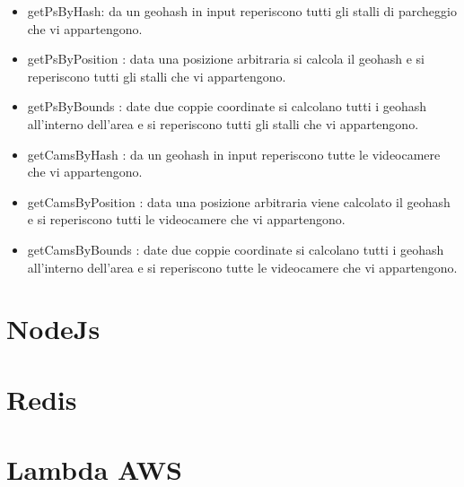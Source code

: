 \begin{itemize}
	\item getPsByHash: da un geohash in input reperiscono tutti gli stalli di parcheggio che vi appartengono.
	\item getPsByPosition : data una posizione arbitraria si calcola il geohash e si reperiscono tutti gli stalli che vi appartengono.
	\item getPsByBounds : date due coppie coordinate si calcolano tutti i geohash all'interno dell'area e si reperiscono tutti gli stalli che vi appartengono.
	\item getCamsByHash : da un geohash in input reperiscono tutte le videocamere che vi appartengono.
	\item getCamsByPosition : data una posizione arbitraria viene calcolato il geohash e si reperiscono tutti le videocamere che vi appartengono.
	\item getCamsByBounds : date due coppie coordinate si calcolano tutti i geohash all'interno dell'area e si reperiscono tutte le videocamere che vi appartengono.
\end{itemize}

\section{NodeJs}

\section{Redis}

\section{Lambda AWS}



